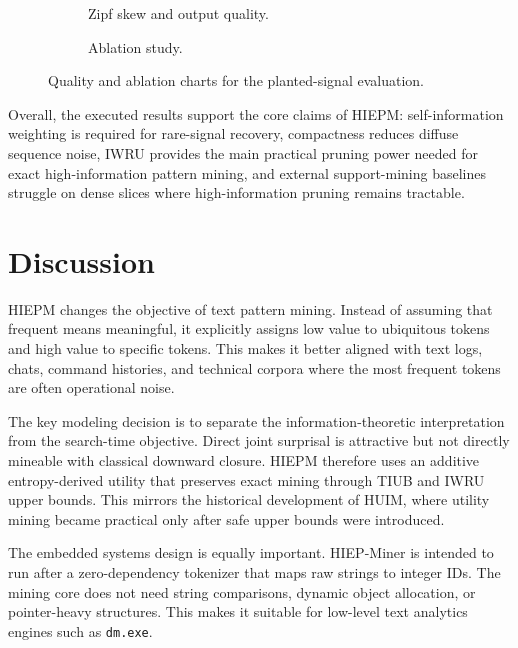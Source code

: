 \documentclass[11pt,a4paper]{article}
\begin{document}
\begin{figure}[H]
\centering
\begin{subfigure}{0.48\textwidth}
    \centering
    
    \caption{Zipf skew and output quality.}
\end{subfigure}
\hfill
\begin{subfigure}{0.48\textwidth}
    \centering
    
    \caption{Ablation study.}
\end{subfigure}
\caption{Quality and ablation charts for the planted-signal evaluation.}
\label{fig:hiep_quality_charts}
\end{figure}

Overall, the executed results support the core claims of HIEPM: self-information weighting is required for rare-signal recovery, compactness reduces diffuse sequence noise, IWRU provides the main practical pruning power needed for exact high-information pattern mining, and external support-mining baselines struggle on dense slices where high-information pruning remains tractable.

\section{Discussion}

HIEPM changes the objective of text pattern mining. Instead of assuming that frequent means meaningful, it explicitly assigns low value to ubiquitous tokens and high value to specific tokens. This makes it better aligned with text logs, chats, command histories, and technical corpora where the most frequent tokens are often operational noise.

The key modeling decision is to separate the information-theoretic interpretation from the search-time objective. Direct joint surprisal is attractive but not directly mineable with classical downward closure. HIEPM therefore uses an additive entropy-derived utility that preserves exact mining through TIUB and IWRU upper bounds. This mirrors the historical development of HUIM, where utility mining became practical only after safe upper bounds were introduced.

The embedded systems design is equally important. HIEP-Miner is intended to run after a zero-dependency tokenizer that maps raw strings to integer IDs. The mining core does not need string comparisons, dynamic object allocation, or pointer-heavy structures. This makes it suitable for low-level text analytics engines such as \texttt{dm.exe}.
\end{document}
